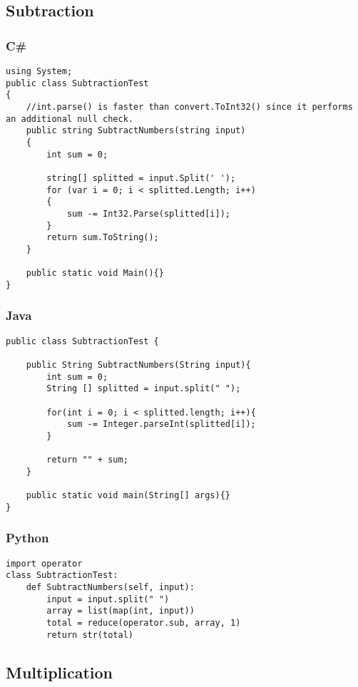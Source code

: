 \subsection{Subtraction}


\subsubsection{C\#}
\lstset{style=sharpc}
\begin{lstlisting}
using System;
public class SubtractionTest
{
    //int.parse() is faster than convert.ToInt32() since it performs an additional null check.
    public string SubtractNumbers(string input)
    {
        int sum = 0;

        string[] splitted = input.Split(' ');
        for (var i = 0; i < splitted.Length; i++)
        {
            sum -= Int32.Parse(splitted[i]);
        }
        return sum.ToString();
    }

	public static void Main(){}
}
\end{lstlisting}

\subsubsection{Java}
\lstset{style=java}
\begin{lstlisting}
public class SubtractionTest {

	public String SubtractNumbers(String input){
		int sum = 0;
		String [] splitted = input.split(" ");

		for(int i = 0; i < splitted.length; i++){
			sum -= Integer.parseInt(splitted[i]);
		}

		return "" + sum;
	}

	public static void main(String[] args){}
}
\end{lstlisting}

\subsubsection{Python}
\lstset{style=python}
\begin{lstlisting}
import operator
class SubtractionTest:
    def SubtractNumbers(self, input):
        input = input.split(" ")
        array = list(map(int, input))
        total = reduce(operator.sub, array, 1)
        return str(total)
\end{lstlisting}



\subsection{Multiplication}


